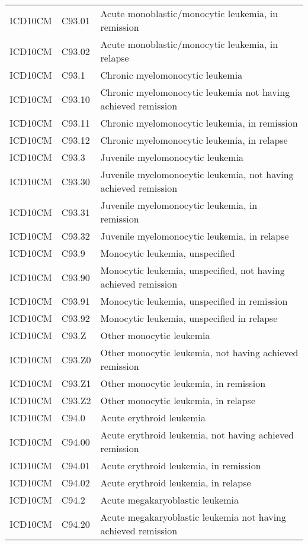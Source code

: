 \begin{longtable}{p{}p{}p{}}
  ICD10CM & C93.01 & Acute monoblastic/monocytic leukemia, in remission \\ 
  ICD10CM & C93.02 & Acute monoblastic/monocytic leukemia, in relapse \\ 
  ICD10CM & C93.1 & Chronic myelomonocytic leukemia \\ 
  ICD10CM & C93.10 & Chronic myelomonocytic leukemia not having achieved remission \\ 
  ICD10CM & C93.11 & Chronic myelomonocytic leukemia, in remission \\ 
  ICD10CM & C93.12 & Chronic myelomonocytic leukemia, in relapse \\ 
  ICD10CM & C93.3 & Juvenile myelomonocytic leukemia \\ 
  ICD10CM & C93.30 & Juvenile myelomonocytic leukemia, not having achieved remission \\ 
  ICD10CM & C93.31 & Juvenile myelomonocytic leukemia, in remission \\ 
  ICD10CM & C93.32 & Juvenile myelomonocytic leukemia, in relapse \\ 
  ICD10CM & C93.9 & Monocytic leukemia, unspecified \\ 
  ICD10CM & C93.90 & Monocytic leukemia, unspecified, not having achieved remission \\ 
  ICD10CM & C93.91 & Monocytic leukemia, unspecified in remission \\ 
  ICD10CM & C93.92 & Monocytic leukemia, unspecified in relapse \\ 
  ICD10CM & C93.Z & Other monocytic leukemia \\ 
  ICD10CM & C93.Z0 & Other monocytic leukemia, not having achieved remission \\ 
  ICD10CM & C93.Z1 & Other monocytic leukemia, in remission \\ 
  ICD10CM & C93.Z2 & Other monocytic leukemia, in relapse \\ 
  ICD10CM & C94.0 & Acute erythroid leukemia \\ 
  ICD10CM & C94.00 & Acute erythroid leukemia, not having achieved remission \\ 
  ICD10CM & C94.01 & Acute erythroid leukemia, in remission \\ 
  ICD10CM & C94.02 & Acute erythroid leukemia, in relapse \\ 
  ICD10CM & C94.2 & Acute megakaryoblastic leukemia \\ 
  ICD10CM & C94.20 & Acute megakaryoblastic leukemia not having achieved remission \\ 

\end{longtable}
